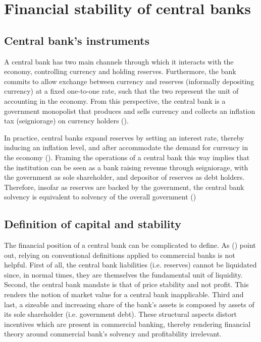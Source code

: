 \documentclass[american]{scrartcl}
\newcommand{\citein}[1]{\citeauthor{#1} (\citeyear{#1})}
\begin{document}
\section{Financial stability of central banks}

\subsection{Central bank's instruments}

A central bank has two main channels through which it interacts with the economy, controlling currency and holding reserves. Furthermore, the bank commits to allow exchange between currency and reserves (informally depositing currency) at a fixed one-to-one rate, such that the two represent the unit of accounting in the economy. From this perspective, the central bank is a government monopolist that produces and sells currency and collects an inflation tax (seigniorage) on currency holders (\cite[p.~15]{Reis2016}).

In practice, central banks expand reserves by setting an interest rate, thereby inducing an inflation level, and after accommodate the demand for currency in the economy (\cite[p.~17]{Reis2016}). Framing the operations of a central bank this way implies that the institution can be seen as a bank raising revenue through seigniorage, with the government as sole shareholder, and depositor of reserves as debt holders. Therefore, insofar as reserves are backed by the government, the central bank solvency is equivalent to solvency of the overall government (\cite{Sims2001})


\subsection{Definition of capital and stability}

The financial position of a central bank can be complicated to define. As \citein{Hall2015} point out, relying on conventional definitions applied to commercial banks is not helpful. First of all, the central bank liabilities (i.e. reserves) cannot be liquidated since, in normal times, they are themselves the fundamental unit of liquidity. Second, the central bank mandate is that of price stability and not profit. This renders the notion of market value for a central bank inapplicable. Third and last, a sizeable and increasing share of the bank's assets is composed by assets of its sole shareholder (i.e. government debt). These structural aspects distort incentives which are present in commercial banking, thereby rendering financial theory around commercial bank's solvency and profitability irrelevant.
\end{document}
